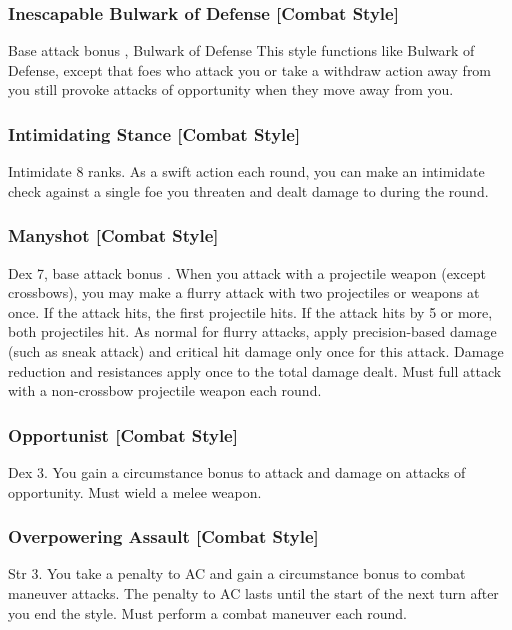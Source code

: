 \subsubsection{Inescapable Bulwark of Defense [Combat Style]}
\featpre Base attack bonus , Bulwark of Defense
\featben This style functions like Bulwark of Defense, except that foes who attack you or take a withdraw action away from you still provoke attacks of opportunity when they move away from you.

\subsubsection{Intimidating Stance [Combat Style]}
 Intimidate 8 ranks.
 As a swift action each round, you can make an intimidate check against a single foe you threaten and dealt damage to during the round.

\subsubsection{Manyshot [Combat Style]}
 Dex 7, base attack bonus .
 When you attack with a projectile weapon (except crossbows), you may make a flurry attack with two projectiles or weapons at once. If the attack hits, the first projectile hits. If the attack hits by 5 or more, both projectiles hit. As normal for flurry attacks, apply precision-based damage (such as sneak attack) and critical hit damage only once for this attack. Damage reduction and resistances apply once to the total damage dealt.
 Must full attack with a non-crossbow projectile weapon each round.

\subsubsection{Opportunist [Combat Style]}
 Dex 3.
 You gain a  circumstance bonus to attack and damage on attacks of opportunity. \babscalingdescription
{} Must wield a melee weapon.

\subsubsection{Overpowering Assault [Combat Style]}
 Str 3.
 You take a  penalty to AC and gain a  circumstance bonus to combat maneuver attacks. \babscalingdescription The penalty to AC lasts until the start of the next turn after you end the style.
 Must perform a combat maneuver each round.

